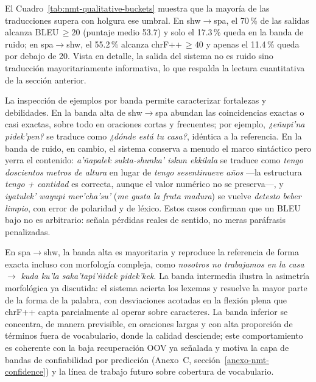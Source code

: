 \documentclass[12pt,a4paper,oneside]{book}
\begin{document}
\begin{table}[h]
\centering
\caption{Distribución de las salidas de \(v_{2.1b}\) reranked por banda de puntaje por oración (conjunto de prueba \texttt{xl}, 446 oraciones por dirección).}
\label{tab:nmt-qualitative-buckets}
\resizebox{\linewidth}{!}{}
\end{table}

El Cuadro~\ref{tab:nmt-qualitative-buckets} muestra que la mayoría de las traducciones supera con holgura ese umbral. En shw\(\rightarrow\)spa, el 70\,\% de las salidas alcanza BLEU\,\(\geq 20\) (puntaje medio 53.7) y solo el 17.3\,\% queda en la banda de ruido; en spa\(\rightarrow\)shw, el 55.2\,\% alcanza chrF++\,\(\geq 40\) y apenas el 11.4\,\% queda por debajo de 20. Vista en detalle, la salida del sistema no es ruido sino traducción mayoritariamente informativa, lo que respalda la lectura cuantitativa de la sección anterior.

La inspección de ejemplos por banda permite caracterizar fortalezas y debilidades. En la banda alta de shw\(\rightarrow\)spa abundan las coincidencias exactas o casi exactas, sobre todo en oraciones cortas y frecuentes; por ejemplo, \emph{¿eñupi'na pidek'pen?} se traduce como \emph{¿dónde está tu casa?}, idéntica a la referencia. En la banda de ruido, en cambio, el sistema conserva a menudo el marco sintáctico pero yerra el contenido: \emph{a'ñapalek sukta-shunka' iskun ekkilala} se traduce como \emph{tengo doscientos metros de altura} en lugar de \emph{tengo sesentinueve años} —la estructura \emph{tengo + cantidad} es correcta, aunque el valor numérico no se preserva—, y \emph{iyatulek' wayupi mer'cha'su'} (\emph{me gusta la fruta madura}) se vuelve \emph{detesto beber limpio}, con error de polaridad y de léxico. Estos casos confirman que un BLEU bajo no es arbitrario: señala pérdidas reales de sentido, no meras paráfrasis penalizadas.

En spa\(\rightarrow\)shw, la banda alta es mayoritaria y reproduce la referencia de forma exacta incluso con morfología compleja, como \emph{nosotros no trabajamos en la casa} \(\rightarrow\) \emph{kuda ku'la saka'tapi'ñidek pidek'kek}. La banda intermedia ilustra la asimetría morfológica ya discutida: el sistema acierta los lexemas y resuelve la mayor parte de la forma de la palabra, con desviaciones acotadas en la flexión plena que chrF++ capta parcialmente al operar sobre caracteres. La banda inferior se concentra, de manera previsible, en oraciones largas y con alta proporción de términos fuera de vocabulario, donde la calidad desciende; este comportamiento es coherente con la baja recuperación OOV ya señalada y motiva la capa de bandas de confiabilidad por predicción (Anexo~C, sección~\ref{anexo-nmt-confidence}) y la línea de trabajo futuro sobre cobertura de vocabulario.
\end{document}
